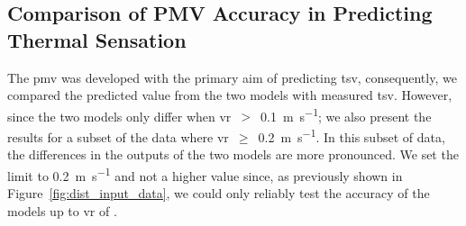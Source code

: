 \subsection{Comparison of PMV Accuracy in Predicting Thermal Sensation}\label{subsec:model-accuracy-comparison-in-predicting-thermal-sensation}
The \ac{pmv} was developed with the primary aim of predicting \ac{tsv}, consequently, we compared the predicted value from the two models with measured \ac{tsv}.
However, since the two models only differ when \ac{vr}~$>$~\qty{0.1}{\m\per\s};
we also present the results for a subset of the data where \ac{vr}~$\geq$~\qty{0.2}{\m\per\s}.
In this subset of data, the differences in the outputs of the two models are more pronounced.
We set the limit to \qty{0.2}{\m\per\s} and not a higher value since, as previously shown in Figure~\ref{fig:dist_input_data}, we could only reliably test the accuracy of the models up to \ac{vr} of .

